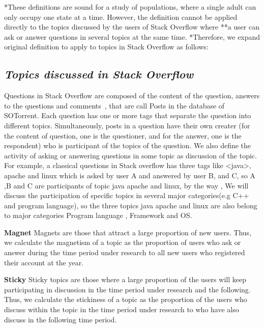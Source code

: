 \documentclass[conference]{IEEEtran}
\begin{document}
*These definitions are sound for a study of populations, where a single adult can only occupy one state at a time. However, the definition cannot be applied directly to the topics discussed by the users of Stack Overflow where **a user can ask or answer questions in several topics at the same time. *Therefore, we expand original definition to apply to topics in Stack Overflow as follows:

\smallskip
\subsection*{\textit{\textbf{Topics discussed in Stack Overflow}}}

Questions in Stack Overflow are composed of the content of the question, answers to the questions and comments~\cite{liu2018mining}, that are call Posts in the database of SOTorrent. Each question has one or more tags that separate the question into different topics. Simultaneously, posts in a question have their own creater (for the content of question, one is the questioner, and for the answer, one is the respondent) who is participant of the topics of the question. We also define the activity of asking or answering questions in some topic as discussion of the topic. For example, a classical questions in Stack overflow has three tags like <java>, apache and linux which is asked by user A and answered by user B, and C, so A ,B and C are participants of topic java apache and linux, by the way , We will discuss the participation of specific topics in several major categories(e.g C++ and program language), so the three topics java apache and linux are also belong to major categories Program language , Framework and OS.
\smallskip

\textbf{Magnet}
Magnets are those that attract a large proportion of new users. Thus, we calculate the magnetism of a topic as the proportion of users who ask or answer during the time period under research to all new users who registered their account at the year.
\smallskip
\smallskip

\textbf{Sticky}
Sticky topics are those where a large proportion of the users will keep participating in discussion in the time period under research and the following. Thus, we calculate the stickiness of a topic as the proportion of the users who discuss within the topic in the time period under research to who have also discuss in the following time period.
\end{document}
